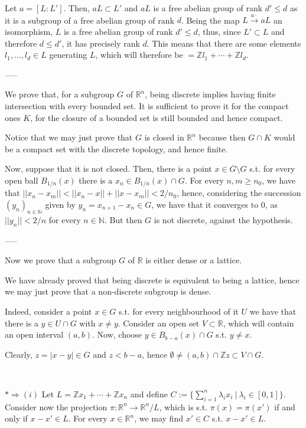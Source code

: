 \documentclass{article}
\newcommand{\numberset}{\mathbb}
\newcommand{\N}{\numberset{N}}
\newcommand{\Z}{\numberset{Z}}
\newcommand{\R}{\numberset{R}}
\newcommand{\exercise}[1]{\noindent {\bf Exercise #1}}
\begin{document}
Let $a=[L:L']$. Then, $aL\subset L'$ and $aL$ is a free abelian group of rank $d'\leq d$ as it is a subgroup of a free abelian group of rank $d$. Being the map $L\xrightarrow{a\cdot} aL$ an isomorphism, $L$ is a free abelian group of rank $d'\leq d$, thus, since $L'\subset L$ and therefore $d\leq d'$, it has precisely rank $d$. This means that there are some elements $l_1,\ldots,l_d\in L$ generating $L$, which will therefore be $=\Z l_1+\cdots+\Z l_d$.

-----

We prove that, for a subgroup $G$ of $\R^n$, being discrete implies having finite intersection with every bounded set. It is sufficient to prove it for the compact ones $K$, for the closure of a bounded set is still bounded and hence compact.

Notice that we may just prove that $G$ is closed in $\R^n$ because then $G\cap K$ would be a compact set with the discrete topology, and hence finite.

Now, suppose that it is not closed. Then, there is a point $x\in\overline{G}\setminus G$ s.t. for every open ball $B_{1/n}(x)$ there is a $x_n\in B_{1/n}(x)\cap G$. For every $n,m\geq n_0$, we have that $||x_n-x_m||<||x_n-x||+||x-x_m||<2/n_0$, hence, considering the succession $(y_n)_{n\in\N}$ given by $y_n=x_{n+1}-x_n\in G$, we have that it converges to 0, as $||y_n||<2/n$ for every $n\in\N$. But then $G$ is not discrete, against the hypothesis.

-----

Now we prove that a subgroup $G$ of $\R$ is either dense or a lattice.

We have already proved that being discrete is equivalent to being a lattice, hence we may just prove that a non-discrete subgroup is dense.

Indeed, consider a point $x\in G$ s.t. for every neighbourhood of it $U$ we have that there is a $y\in U\cap G$ with $x\neq y$. Consider an open set $V\subset\R$, which will contain an open interval $(a,b)$. Now, choose $y\in B_{b-a}(x)\cap G$ s.t. $y\neq x$.

Clearly, $z=|x-y|\in G$ and $z<b-a$, hence $\emptyset\neq (a,b)\cap\Z z\subset V\cap G$.

~\\
\exercise{6}

$*\Rightarrow (i)$ Let $L=\Z x_1+\cdots +\Z x _n$ and define $C:=\{\sum_{i=1}^n \lambda_i x_i\ |\ \lambda_i\in [0,1]\}$. Consider now the projection $\pi:\R^n\rightarrow\R^n/L$, which is s.t. $\pi(x)=\pi(x')$ if and only if $x-x'\in L$. For every $x\in\R^n$, we may find $x'\in C$ s.t. $x-x'\in L$.
\end{document}

